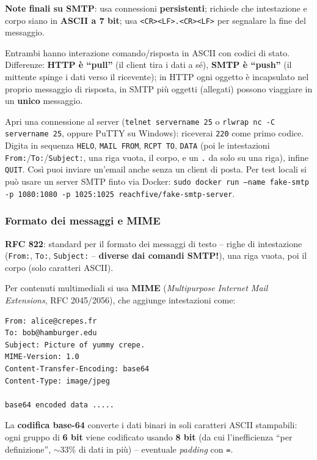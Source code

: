 \documentclass[12pt, a4paper]{article}
\begin{document}
\textbf{Note finali su SMTP}: usa connessioni \textbf{persistenti}; richiede che intestazione e corpo siano in \textbf{ASCII a 7 bit}; usa \texttt{<CR><LF>.<CR><LF>} per segnalare la fine del messaggio.

\begin{tcolorbox}[colback=cyan!5, colframe=blue!40!black, title=\textbf{Confronto SMTP vs HTTP}]
Entrambi hanno interazione comando/risposta in ASCII con codici di stato. Differenze: \textbf{HTTP è ``pull''} (il client tira i dati a sé), \textbf{SMTP è ``push''} (il mittente spinge i dati verso il ricevente); in HTTP ogni oggetto è incapsulato nel proprio messaggio di risposta, in SMTP più oggetti (allegati) possono viaggiare in un \textbf{unico} messaggio.
\end{tcolorbox}

\begin{tcolorbox}[colback=orange!5, colframe=orange!70!black, title=\textbf{Esercizio pratico 2.3 -- Dialogare a mano con un server SMTP}]
Apri una connessione al server (\texttt{telnet servername 25} o \texttt{rlwrap nc -C servername 25}, oppure PuTTY su Windows): riceverai \texttt{220} come primo codice. Digita in sequenza \texttt{HELO}, \texttt{MAIL FROM}, \texttt{RCPT TO}, \texttt{DATA} (poi le intestazioni \texttt{From:}/\texttt{To:}/\texttt{Subject:}, una riga vuota, il corpo, e un \texttt{.} da solo su una riga), infine \texttt{QUIT}. Così puoi inviare un'email anche senza un client di posta. Per test locali si può usare un server SMTP finto via Docker: \texttt{sudo docker run --name fake-smtp -p 1080:1080 -p 1025:1025 reachfive/fake-smtp-server}.
\end{tcolorbox}

\subsubsection{Formato dei messaggi e MIME}

\textbf{RFC 822}: standard per il formato dei messaggi di testo -- righe di intestazione (\texttt{From:}, \texttt{To:}, \texttt{Subject:} -- \textbf{diverse dai comandi SMTP!}), una riga vuota, poi il corpo (solo caratteri ASCII).

Per contenuti multimediali si usa \textbf{MIME} (\textit{Multipurpose Internet Mail Extensions}, RFC 2045/2056), che aggiunge intestazioni come:
\begin{verbatim}
From: alice@crepes.fr
To: bob@hamburger.edu
Subject: Picture of yummy crepe.
MIME-Version: 1.0
Content-Transfer-Encoding: base64
Content-Type: image/jpeg

base64 encoded data .....
\end{verbatim}
La \textbf{codifica base-64} converte i dati binari in soli caratteri ASCII stampabili: ogni gruppo di \textbf{6 bit} viene codificato usando \textbf{8 bit} (da cui l'inefficienza ``per definizione'', $\sim$33\% di dati in più) -- eventuale \textit{padding} con \texttt{=}.
\end{document}
